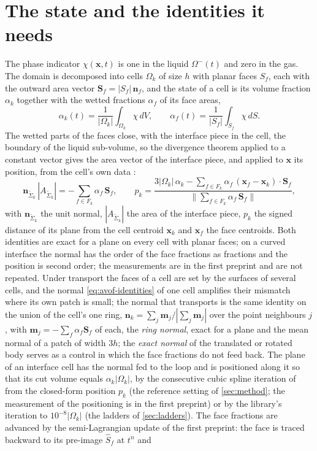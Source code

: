 \documentclass[preprint,12pt]{elsarticle}
\newcommand{\x}{\mathbf{x}}
\newcommand{\n}{\mathbf{n}}
\newcommand{\Sf}{\mathbf{S}_f}
\newcommand{\Sfhat}{\hat{S}_f}
\newcommand{\nSk}{\mathbf{n}_{\tilde{\Sigma}_k}}
\newcommand{\ASk}{A_{\tilde{\Sigma}_k}}
\begin{document}
\section{The state and the identities it needs}
\label{sec:state}

The phase indicator $\chi(\x,t)$ is one in the liquid $\Omega^-(t)$ and zero in the gas. The domain is decomposed into cells $\Omega_k$ of size $h$ with planar faces $S_f$, each with the outward area vector $\Sf = |S_f|\,\n_f$, and the state of a cell is its volume fraction $\alpha_k$ together with the wetted fractions $\alpha_f$ of its face areas,
\begin{equation}
\alpha_k(t) = \frac{1}{|\Omega_k|}\int_{\Omega_k}\chi\,dV, \qquad
\alpha_f(t) = \frac{1}{|S_f|}\int_{S_f}\chi\,dS .
\label{eq:fractions}
\end{equation}
The wetted parts of the faces close, with the interface piece in the cell, the boundary of the liquid sub-volume, so the divergence theorem applied to a constant vector gives the area vector of the interface piece, and applied to $\x$ its position, from the cell's own data \citep{MaricDAVOF2026}:
\begin{equation}
\nSk\,|\ASk| = -\sum_{f \in F_k}\alpha_f\,\Sf, \qquad
p_k = \frac{3|\Omega_k|\,\alpha_k - \sum_{f \in F_k}\alpha_f\,(\x_f - \x_k)\cdot\Sf}{\big\|\sum_{f \in F_k}\alpha_f\,\Sf\big\|},
\label{eq:avof-identities}
\end{equation}
with $\nSk$ the unit normal, $|\ASk|$ the area of the interface piece, $p_k$ the signed distance of its plane from the cell centroid $\x_k$ and $\x_f$ the face centroids. Both identities are exact for a plane on every cell with planar faces; on a curved interface the normal has the order of the face fractions as fractions and the position is second order; the measurements are in the first preprint and are not repeated. Under transport the faces of a cell are set by the surfaces of several cells, and the normal \cref{eq:avof-identities} of one cell amplifies their mismatch where its own patch is small; the normal that transports is the same identity on the union of the cell's one ring, $\n_k = \sum_j \mathbf{m}_j / |\sum_j \mathbf{m}_j|$ over the point neighbours $j$, with $\mathbf{m}_j = -\sum_f \alpha_f\Sf$ of each, the \emph{ring normal}, exact for a plane and the mean normal of a patch of width $3h$; the \emph{exact normal} of the translated or rotated body serves as a control in which the face fractions do not feed back. The plane of an interface cell has the normal fed to the loop and is positioned along it so that its cut volume equals $\alpha_k|\Omega_k|$, by the consecutive cubic spline iteration of \citet{Maric2021CCS} from the closed-form position $p_k$ (the reference setting of \cref{sec:method}; the measurement of the positioning is in the first preprint) or by the library's iteration to $10^{-8}|\Omega_k|$ (the ladders of \cref{sec:ladders}). The face fractions are advanced by the semi-Lagrangian update of the first preprint: the face is traced backward to its pre-image $\Sfhat$ at $t^n$ and
\end{document}
